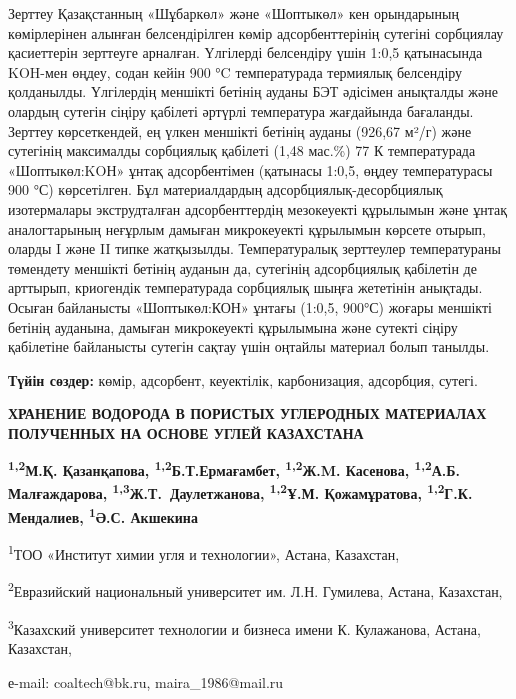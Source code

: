 Зерттеу Қазақстанның «Шұбаркөл» және «Шоптыкөл» кен орындарының
көмірлерінен алынған белсендірілген көмір адсорбенттерінің сутегіні
сорбциялау қасиеттерін зерттеуге арналған. Үлгілерді белсендіру үшін
1:0,5 қатынасында KOH-мен өңдеу, содан кейін 900 °C температурада
термиялық белсендіру қолданылды. Үлгілердің меншікті бетінің ауданы БЭТ
әдісімен анықталды және олардың сутегін сіңіру қабілеті әртүрлі
температура жағдайында бағаланды. Зерттеу көрсеткендей, ең үлкен
меншікті бетінің ауданы (926,67 м²/г) және сутегінің максималды
сорбциялық қабілеті (1,48 мас.\%) 77 К температурада «Шоптыкөл:KOН»
ұнтақ адсорбентімен (қатынасы 1:0,5, өңдеу температурасы 900 °С)
көрсетілген. Бұл материалдардың адсорбциялық-десорбциялық изотермалары
экструдталған адсорбенттердің мезокеуекті құрылымын және ұнтақ
аналогтарының неғұрлым дамыған микрокеуекті құрылымын көрсете отырып,
оларды I және II типке жатқызылды. Температуралық зерттеулер
температураны төмендету меншікті бетінің ауданын да, сутегінің
адсорбциялық қабілетін де арттырып, криогендік температурада сорбциялық
шыңға жететінін анықтады. Осыған байланысты «Шоптыкөл:КОН» ұнтағы
(1:0,5, 900°С) жоғары меншікті бетінің ауданына, дамыған микрокеуекті
құрылымына және сутекті сіңіру қабілетіне байланысты сутегін сақтау үшін
оңтайлы материал болып танылды.

{\bfseries Түйін сөздер:} көмір, адсорбент, кеуектілік, карбонизация,
адсорбция, сутегі.

\begin{articleheader}
{\bfseries ХРАНЕНИЕ ВОДОРОДА В ПОРИСТЫХ УГЛЕРОДНЫХ МАТЕРИАЛАХ ПОЛУЧЕННЫХ НА ОСНОВЕ УГЛЕЙ КАЗАХСТАНА}

{\bfseries
\textsuperscript{1,2}М.Қ. Қазанқапова\textsuperscript{\envelope },
\textsuperscript{1,2}Б.Т.Ермағамбет,
\textsuperscript{1,2}Ж.M. Касенова,
\textsuperscript{1,2}А.Б. Малғаждарова,
\textsuperscript{1,3}Ж.Т.~Даулетжанова,
\textsuperscript{1,2}Ұ.М. Қожамұратова,
\textsuperscript{1,2}Г.К. Мендалиев,
\textsuperscript{1}Ә.С. Акшекина
}
\end{articleheader}

\begin{affiliation}
\textsuperscript{1}ТОО «Институт химии угля и технологии», Астана, Казахстан,

\textsuperscript{2}Евразийский национальный университет им. Л.Н. Гумилева, Астана, Казахстан,

\textsuperscript{3}Казахский университет технологии и бизнеса имени К. Кулажанова, Астана, Казахстан,

е-mail: coaltech@bk.ru, maira\_1986@mail.ru
\end{affiliation}

